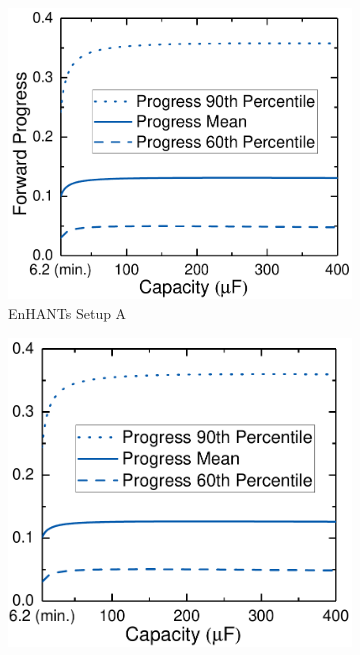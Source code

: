 \begin{figure}
    \centering
    \begin{subfigure}{0.51\columnwidth}
        \centering
        \includegraphics[width=\columnwidth]{ch4_sizingapproach/figures/HarvStorRan2Fig1}
        \caption{EnHANTs Setup A}
        \label{fig:harvstorrange1}
    \end{subfigure}
    \begin{subfigure}{0.483\columnwidth}
        \centering
        \includegraphics[width=\columnwidth]{ch4_sizingapproach/figures/HarvStorRan2Fig2}

\end{subfigure}
\end{figure}

